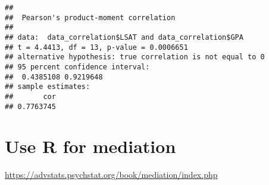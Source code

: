 \documentclass[]{book}
\begin{document}
\begin{verbatim}
## 
##  Pearson's product-moment correlation
## 
## data:  data_correlation$LSAT and data_correlation$GPA
## t = 4.4413, df = 13, p-value = 0.0006651
## alternative hypothesis: true correlation is not equal to 0
## 95 percent confidence interval:
##  0.4385108 0.9219648
## sample estimates:
##       cor 
## 0.7763745
\end{verbatim}

\hypertarget{use-r-for-mediation}{%
\section{Use R for mediation}\label{use-r-for-mediation}}

\url{https://advstats.psychstat.org/book/mediation/index.php}


\end{document}
